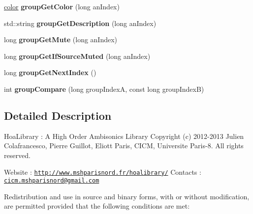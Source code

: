 \begin{DoxyCompactItemize}
\item 
\hypertarget{class_sources_manager_a6c88c37f8e44d170caf46d207bbc48fb}{\hyperlink{structcolor}{color} {\bfseries group\-Get\-Color} (long an\-Index)}\label{class_sources_manager_a6c88c37f8e44d170caf46d207bbc48fb}

\item 
\hypertarget{class_sources_manager_a9be48f955fb2216876279f948caf88f0}{std\-::string {\bfseries group\-Get\-Description} (long an\-Index)}\label{class_sources_manager_a9be48f955fb2216876279f948caf88f0}

\item 
\hypertarget{class_sources_manager_aeb2ac0aaca7d404d234e99c8edd1353f}{long {\bfseries group\-Get\-Mute} (long an\-Index)}\label{class_sources_manager_aeb2ac0aaca7d404d234e99c8edd1353f}

\item 
\hypertarget{class_sources_manager_a639bb7994e1a7b581941c6e422af6280}{long {\bfseries group\-Get\-If\-Source\-Muted} (long an\-Index)}\label{class_sources_manager_a639bb7994e1a7b581941c6e422af6280}

\item 
\hypertarget{class_sources_manager_a302176eba9e00d95b4229ab5136f6d4a}{long {\bfseries group\-Get\-Next\-Index} ()}\label{class_sources_manager_a302176eba9e00d95b4229ab5136f6d4a}

\item 
\hypertarget{class_sources_manager_a0f2c869920ae6ef67b629b0d041ac2d1}{int {\bfseries group\-Compare} (long group\-Index\-A, const long group\-Index\-B)}\label{class_sources_manager_a0f2c869920ae6ef67b629b0d041ac2d1}

\end{DoxyCompactItemize}


\subsection{Detailed Description}
Hoa\-Library \-: A High Order Ambisonics Library Copyright (c) 2012-\/2013 Julien Colafrancesco, Pierre Guillot, Eliott Paris, C\-I\-C\-M, Universite Paris-\/8. All rights reserved.

Website \-: \href{http://www.mshparisnord.fr/hoalibrary/}{\tt http\-://www.\-mshparisnord.\-fr/hoalibrary/} Contacts \-: \href{mailto:cicm.mshparisnord@gmail.com}{\tt cicm.\-mshparisnord@gmail.\-com}

Redistribution and use in source and binary forms, with or without modification, are permitted provided that the following conditions are met\-:


